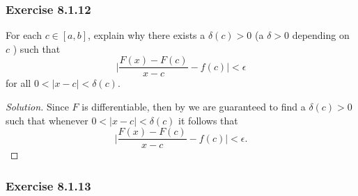 \subsubsection{Exercise 8.1.12} For each \( c \in [a,b]  \), explain why there exists a \( \delta(c) > 0  \) (a \( \delta > 0  \) depending on \( c   \) ) such that 
\[  \Big| \frac{ F(x) - F(c)  }{ x -c  }  - f(c)  \Big|  < \epsilon \]
for all \( 0 < | x -c  | < \delta(c)  \).
\begin{proof}[Solution]
Since \( F  \) is differentiable, then by we are guaranteed to find a \( \delta(c) > 0  \) such that whenever \( 0 < | x - c  |  < \delta(c)  \) it follows that 
\[  \Big| \frac{ F(x) - F(c)  }{ x -c  }  - f(c)  \Big| < \epsilon. \]



\end{proof}


\subsubsection{Exercise 8.1.13} 

